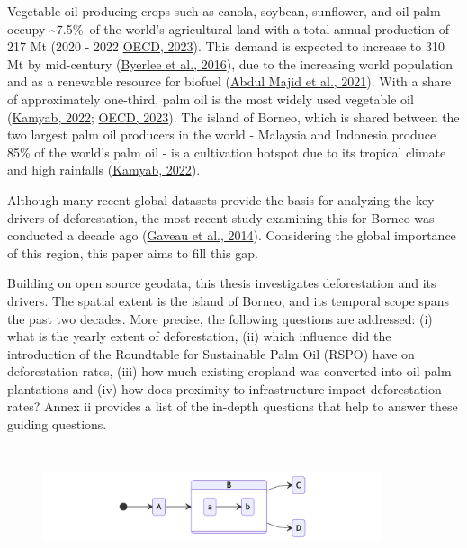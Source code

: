 \documentclass[
  letterpaper,
  DIV=11,
  numbers=noendperiod]{scrreprt}
\begin{document}
Vegetable oil producing crops such as canola, soybean, sunflower, and
oil palm occupy \textasciitilde7.5\%~of the world's agricultural land
with a total annual production of 217 Mt (2020 - 2022
\protect\hyperlink{ref-oecdOECDFAOAgriculturalOutlook2023}{OECD, 2023}).
This demand is expected to increase to 310 Mt by mid-century
(\protect\hyperlink{ref-byerleeTropicalOilCrop2016}{Byerlee et al.,
2016}), due to the increasing world population and as a renewable
resource for biofuel
(\protect\hyperlink{ref-abdulmajidSustainablePalmOil2021}{Abdul Majid et
al., 2021}). With a share of approximately one-third, palm oil is the
most widely used vegetable oil
(\protect\hyperlink{ref-kamyabElaeisGuineensis2022}{Kamyab, 2022};
\protect\hyperlink{ref-oecdOECDFAOAgriculturalOutlook2023}{OECD, 2023}).
The island of Borneo, which is shared between the two largest palm oil
producers in the world - Malaysia and Indonesia produce 85\% of the
world's palm oil - is a cultivation hotspot due to its tropical climate
and high rainfalls
(\protect\hyperlink{ref-kamyabElaeisGuineensis2022}{Kamyab, 2022}).

Although many recent global datasets provide the basis for analyzing the
key drivers of deforestation, the most recent study examining this for
Borneo was conducted a decade ago
(\protect\hyperlink{ref-gaveauFourDecadesForest2014}{Gaveau et al.,
2014}). Considering the global importance of this region, this paper
aims to fill this gap.

Building on open source geodata, this thesis investigates deforestation
and its drivers. The spatial extent is the island of Borneo, and its
temporal scope spans the past two decades. More precise, the following
questions are addressed: (i) what is the yearly extent of deforestation,
(ii) which influence did the introduction of the Roundtable for
Sustainable Palm Oil (RSPO) have on deforestation rates, (iii) how much
existing cropland was converted into oil palm plantations and (iv) how
does proximity to infrastructure impact deforestation rates? Annex ii
provides a list of the in-depth questions that help to answer these
guiding questions.

\begin{figure}[H]

{\centering \includegraphics[width=3.92in,height=1.4in]{text/03_introduction_files/figure-latex/mermaid-figure-1.png}

}

\end{figure}
\end{document}
